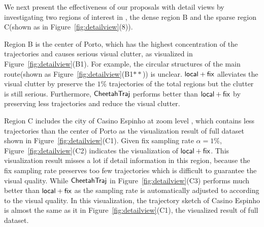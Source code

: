 We next present the effectiveness of our proposals with detail views by investigating two regions of interest in \pt{}, the dense region B and the sparse region C(shown as in Figure~\ref{fig:detailview}(8)).

Region B is the center of Porto, which has the highest concentration of the trajectories and causes serious visual clutter, as visualized in Figure~\ref{fig:detailview}(B1).
For example, the circular structures of the main route(shown as Figure~\ref{fig:detailview}(B1$**$)) is unclear.
$\mathsf{local+fix}$ alleviates the visual clutter by preserve the $1\%$ trajectories of the total regions but the clutter is still serious. Furthermore, $\mathsf{CheetahTraj}$ performs better than $\mathsf{local+fix}$ by preserving less trajectories and reduce the visual clutter. 


Region C includes the city of Casino Espinho at zoom level , which contains less trajectories than the center of Porto as the visualization result of full dataset shown in Figure~\ref{fig:detailview}(C1). 
Given fix sampling rate $\alpha=1\%$, Figure~\ref{fig:detailview}(C2) indicates the visualization of $\mathsf{local+fix}$. This visualization result misses a lot if detail information in this region, because the fix sampling rate preserves too few trajectories which is difficult to guarantee the visual quality.
While $\mathsf{CheetahTraj}$ in Figure~\ref{fig:detailview}(C3) performs much better than $\mathsf{local+fix}$ as the sampling rate is automatically adjusted to according to the visual quality. In this visualization, the trajectory sketch of Casino Espinho is almost the same as it in Figure~\ref{fig:detailview}(C1), the visualized result of full dataset.
